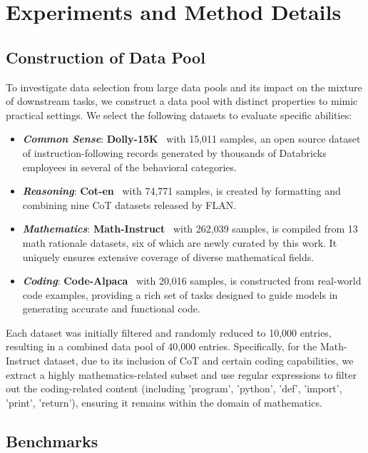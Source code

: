 \section{Experiments and Method Details}
\label{sec:appendix-div-setting}

\subsection{Construction of Data Pool}
\label{sec:appendix-data-pool}

To investigate data selection from large data pools and its impact on the mixture of downstream tasks, we construct a data pool with distinct properties to mimic practical settings. We select the following datasets to evaluate specific abilities:

\begin{itemize}
    \item \textbf{\textit{Common Sense}}: \textbf{Dolly-15K}~\cite{dolly-15k} with 15,011 samples, an open source dataset of instruction-following records generated by thousands of Databricks employees in several of the behavioral categories.
    \item \textbf{\textit{Reasoning}}: \textbf{Cot-en}~\cite{cot-en} with 74,771 samples, is created by formatting and combining nine CoT datasets released by FLAN.
    \item \textbf{\textit{Mathematics}}: \textbf{Math-Instruct}~\cite{math-instruct} with 262,039 samples, is compiled from 13 math rationale datasets, six of which are newly curated by this work. It uniquely ensures extensive coverage of diverse mathematical fields.
    \item \textbf{\textit{Coding}}: \textbf{Code-Alpaca}~\cite{code-alpaca} with 20,016 samples, is constructed from real-world code examples, providing a rich set of tasks designed to guide models in generating accurate and functional code.
\end{itemize}

Each dataset was initially filtered and randomly reduced to 10,000 entries, resulting in a combined data pool of 40,000 entries. Specifically, for the Math-Instruct dataset, due to its inclusion of CoT and certain coding capabilities, we extract a highly mathematics-related subset and use regular expressions to filter out the coding-related content (including 'program', 'python', 'def', 'import', 'print', 'return'), ensuring it remains within the domain of mathematics.


\subsection{Benchmarks} \label{sec:appendix-benchmark}

